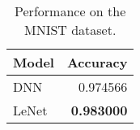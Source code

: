 \begin{table}[t]
\centering
\small
\caption{Performance on the MNIST dataset. }
\label{tab:baseline}
\begin{tabular}{lr}
\toprule
Model & Accuracy \\
\midrule
DNN & 0.974566 \\
LeNet & \textbf{0.983000} \\
\bottomrule
\end{tabular}
\end{table}
